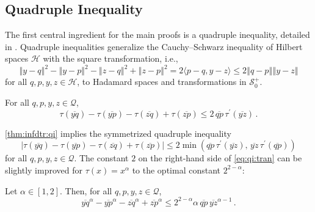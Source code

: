 \documentclass{article}
\newcommand*{\mc}[1]{\mathcal{#1}}
\newcommand{\lb}{\left(} %
\newcommand{\rb}{\right)} %
\newcommand{\br}[1]{\lb #1 \rb} %
\newcommand{\brOf}[1]{\!\br{#1}} %
\newcommand{\absOf}[1]{\left\vert #1 \right\vert} %
\newcommand{\normOf}[1]{\left\Vert#1\right\Vert}
\newcommand{\ipof}[2]{\langle #1, #2\rangle}
\newcommand{\pr}{^\prime}
\newcommand{\eqfs}{\,.}
\newcommand{\ol}[2]{\overline{#1#2}}
\newcommand{\tran}{\tau}
\newcommand{\dtran}{\tau\pr}
\newcommand{\setcciz}{\mc S_0^+}
\begin{document}
\subsection{Quadruple Inequality}\label{ssec:qi}
%
The first central ingredient for the main proofs is a quadruple inequality, detailed in \cite{quadruple}.
Quadruple inequalities generalize the Cauchy--Schwarz inequality of Hilbert spaces $\mc H$ with the square transformation, i.e.,
\begin{equation}
	\normOf{y-q}^2 - \normOf{y-p}^2 - \normOf{z-q}^2 + \normOf{z-p}^2 = 2 \ipof{p-q}{y-z} \leq 2 \normOf{q-p} \normOf{y-z}
\end{equation} 
for all $q,p,y,z\in\mc H$, to Hadamard spaces and transformations in $\setcciz$.
%
\begin{proposition}\label{thm:infdtr:qi}
    For all $q,p,y,z\in\mc Q$,
    \begin{equation}\label{eq:qi:tran}
        \tran(\ol yq) -  \tran(\ol yp) - \tran(\ol zq) + \tran(\ol zp) \leq 2 \, \ol qp\, \dtran(\ol yz)
        \eqfs
    \end{equation}
\end{proposition}
%
\cref{thm:infdtr:qi} implies the symmetrized quadruple inequality
\begin{equation}
	\absOf{\tran(\ol yq) -  \tran(\ol yp) - \tran(\ol zq) + \tran(\ol zp)} \leq  2 \min\brOf{\ol qp\, \dtran(\ol yz),\, \ol yz\, \dtran(\ol qp)}
\end{equation}
for all $q,p,y,z\in\mc Q$.
The constant $2$ on the right-hand side of \eqref{eq:qi:tran} can be slightly improved for $\tran(x) = x^\alpha$ to the optimal constant $2^{2-\alpha}$:
%
\begin{proposition}\label{thm:power:qi}
	Let $\alpha\in[1,2]$.
	Then, for all $q,p,y,z\in\mc Q$,
	\begin{equation}
		\ol yq^\alpha- \ol yp^\alpha - \ol zq^\alpha + \ol zp^\alpha \leq 2^{2-\alpha} \alpha \, \ol qp\, \ol yz^{\alpha-1}
		\eqfs
	\end{equation}
\end{proposition}
%
%
%
%
\end{document}
